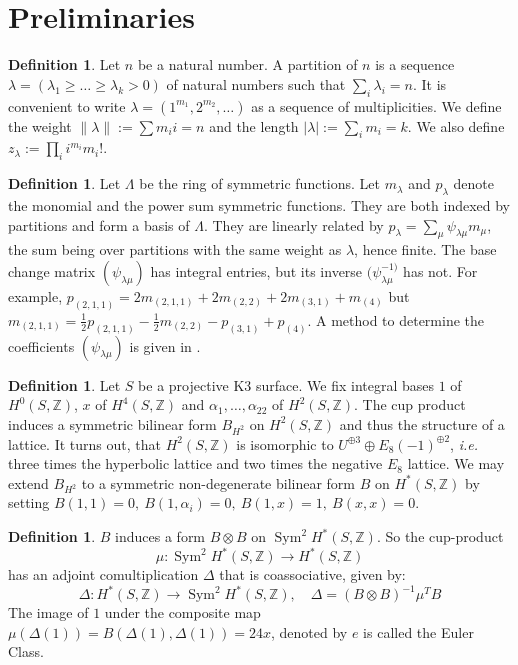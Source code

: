 \documentclass{amsart}
\DeclareMathOperator{\Sym}{Sym}
\newcommand{\ie}{{\it i.e. }}
\newcommand{\One}{1}
\newcommand{\coloneqq}{:=}
\newcommand{\IZ}{\mathbb{Z}}
\theoremstyle{plain}
\theoremstyle{definition}
\newtheorem{definition}[theorem]{Definition}
\theoremstyle{remark}
\begin{document}
\section{Preliminaries}
\begin{definition}
Let $n$ be a natural number. A partition of $n$ is a sequence $\lambda = (\lambda_1\geq\ldots\geq\lambda_k>0)$ of natural numbers such that $\sum_i \lambda_i =n$. It is convenient to write $\lambda = (1^{m_1},2^{m_2},\ldots)$ as a sequence of multiplicities. We define the weight $\|\lambda\| :=\sum m_i i =n$ and the length $|\lambda| := \sum_i m_i =k$. We also define $z_\lambda \coloneqq\prod_i i^{m_i} m_i!$. 
\end{definition}
\begin{definition} \label{SymFun}
Let $\Lambda$ be the ring of symmetric functions. Let $m_\lambda$ and $p_\lambda$ denote the monomial and the power sum symmetric functions. They are both indexed by partitions and form a basis of $\Lambda$. They are linearly related by $p_\lambda = \sum_{\mu} \psi_{\lambda\mu}m_\mu$, the sum being over partitions with the same weight as $\lambda$, hence finite. The base change matrix $(\psi_{\lambda\mu})$ has integral entries, but its inverse $(\psi_{\lambda\mu}^{-1)}$ has not. For example, $p_{(2,1,1)} = 2m_{(2,1,1)} + 2m_{(2,2)}+2m_{(3,1)}+m_{(4)} $ but $ m_{(2,1,1)} = \frac{1}{2}p_{(2,1,1)} -\frac{1}{2}m_{(2,2)} -p_{(3,1)}+p_{(4)}$. A method to determine the coefficients $(\psi_{\lambda\mu})$ is given in \cite[Sect. 3.7]{Lascoux}.
\end{definition}
\begin{definition}
Let $S$ be a projective K3 surface. We fix integral bases $\One$ of $H^0(S,\IZ)$, $x$ of $H^4(S,\IZ)$ and $\alpha_1,\ldots ,\alpha_{22}$ of $H^2(S,\IZ)$. The cup product induces a symmetric bilinear form $B_{H^2}$ on $H^2(S,\IZ)$ and thus the structure of a lattice. It turns out, that $H^2(S,\IZ)$ is isomorphic to $U^{\oplus 3}\oplus E_8(-1)^{\oplus 2}$, \ie three times the hyperbolic lattice and two times the negative $E_8$ lattice.
We may extend $B_{H^2}$ to a symmetric non-degenerate bilinear form $B$ on $H^\ast(S,\IZ)$ by setting $ B(\One,\One) = 0,\ B(\One,\alpha_i) = 0,\ B(\One,x) = 1, \ B(x,x) = 0$.
\end{definition}
\begin{definition}
$B$ induces a form $B\otimes B$ on $\Sym^2H^\ast(S,\IZ)$. So the cup-product 
\begin{equation*}
\mu : \Sym ^2H^{*}(S,\IZ) \longrightarrow H^\ast(S,\IZ) 
\end{equation*}
has an adjoint comultiplication $\Delta$ that is coassociative, given by:
\begin{equation*}
\Delta : H^\ast(S,\IZ) \longrightarrow \Sym^2H^\ast(S,\IZ),\quad \Delta = (B\otimes B)^{-1}\mu^TB
\end{equation*}
The image of $\One$ under the composite map $\mu(\Delta(\One)) = B(\Delta(\One),\Delta(\One)) = 24 x$, denoted by $e$ is called the Euler Class.
\end{definition}
\end{document}
